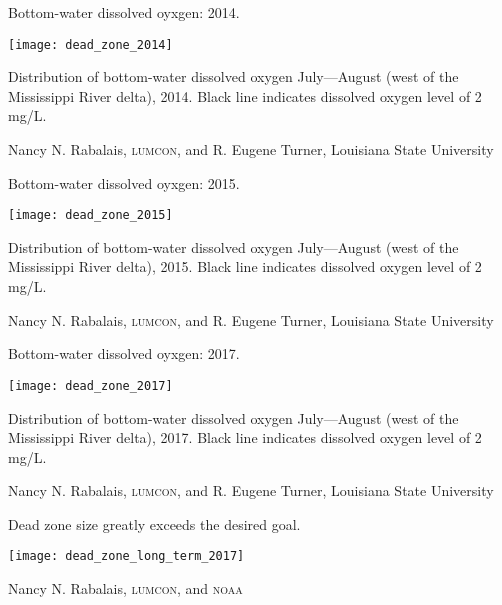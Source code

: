 \documentclass[t]{beamer}
\begin{document}
%
%
%	
%	
%
%
\begin{frame}{Bottom-water dissolved oyxgen: 2014.}

	\texttt{[image: dead\_zone\_2014]}

	Distribution of bottom-water dissolved oxygen July—August (west of the Mississippi River delta), 2014. Black line indicates dissolved oxygen level of 2 mg/L.
	
	\vfilll
	
	\hfill \tiny Nancy N. Rabalais, \textsc{lumcon}, and R. Eugene Turner, Louisiana State University

\end{frame}

%
\begin{frame}{Bottom-water dissolved oyxgen: 2015.}

	\texttt{[image: dead\_zone\_2015]}

	Distribution of bottom-water dissolved oxygen July—August (west of the Mississippi River delta), 2015. Black line indicates dissolved oxygen level of 2 mg/L.
	
	\vfilll
	
	\hfill \tiny Nancy N. Rabalais, \textsc{lumcon}, and R. Eugene Turner, Louisiana State University

\end{frame}
%

\begin{frame}{Bottom-water dissolved oyxgen: 2017.}

\texttt{[image: dead\_zone\_2017]}

Distribution of bottom-water dissolved oxygen July—August (west of the Mississippi River delta), 2017. Black line indicates dissolved oxygen level of 2 mg/L.

\vfilll

\hfill \tiny Nancy N. Rabalais, \textsc{lumcon}, and R. Eugene Turner, Louisiana State University

\end{frame}
%
\begin{frame}{Dead zone size greatly exceeds the desired goal.}

	{\centering \texttt{[image: dead\_zone\_long\_term\_2017]}\par
	}

	\vfilll
	
	\hfill \tiny Nancy N. Rabalais, \textsc{lumcon}, and \textsc{noaa} %

\end{frame}
%
\end{document}
